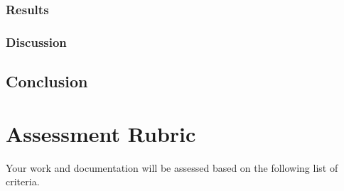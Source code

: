 \documentclass[letterpaper,10pt,english]{sphinxmanual}
\begin{document}
\subsection{Results}
\label{\detokenize{docs/BrachaToueg/results:results}}

\subsection{Discussion}
\label{\detokenize{docs/BrachaToueg/results:discussion}}
\sphinxstepscope


\section{Conclusion}
\label{\detokenize{docs/BrachaToueg/conclusion:conclusion}}\label{\detokenize{docs/BrachaToueg/conclusion::doc}}
\sphinxstepscope


\chapter{Assessment Rubric}
\label{\detokenize{docs/rubric:assessment-rubric}}\label{\detokenize{docs/rubric::doc}}
\sphinxAtStartPar
Your work and documentation will be assessed based on the following list of criteria.
\end{document}

